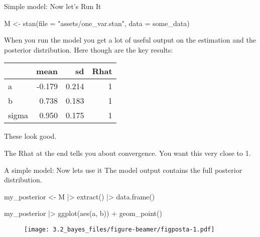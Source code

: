 \documentclass[
  11pt,
  ignorenonframetext,
]{beamer}
\newenvironment{Shaded}{\begin{snugshade}}{\end{snugshade}}
\newcommand{\AttributeTok}[1]{\textcolor[rgb]{0.40,0.45,0.13}{#1}}
\newcommand{\FunctionTok}[1]{\textcolor[rgb]{0.28,0.35,0.67}{#1}}
\newcommand{\NormalTok}[1]{\textcolor[rgb]{0.00,0.23,0.31}{#1}}
\newcommand{\OtherTok}[1]{\textcolor[rgb]{0.00,0.23,0.31}{#1}}
\newcommand{\SpecialCharTok}[1]{\textcolor[rgb]{0.37,0.37,0.37}{#1}}
\newcommand{\StringTok}[1]{\textcolor[rgb]{0.13,0.47,0.30}{#1}}
\begin{document}
\begin{frame}[fragile]{Simple model: Now let's Run It}
\protect\hypertarget{simple-model-now-lets-run-it}{}
\begin{Shaded}
\begin{Highlighting}[]
\NormalTok{M }\OtherTok{\textless{}{-}} \FunctionTok{stan}\NormalTok{(}\AttributeTok{file =} \StringTok{"assets/one\_var.stan"}\NormalTok{, }\AttributeTok{data =}\NormalTok{ some\_data)}
\end{Highlighting}
\end{Shaded}

When you run the model you get a lot of useful output on the estimation
and the posterior distribution. Here though are the key results:

\begin{tabular}{l|r|r|r}
\hline
  & mean & sd & Rhat\\
\hline
a & -0.179 & 0.214 & 1\\
\hline
b & 0.738 & 0.183 & 1\\
\hline
sigma & 0.950 & 0.175 & 1\\
\hline
\end{tabular}

These look good.

The Rhat at the end tells you about convergence. You want this very
close to 1.
\end{frame}

\begin{frame}[fragile]{A simple model: Now lets use it}
\protect\hypertarget{a-simple-model-now-lets-use-it}{}
The model output contains the full posterior distribution.

\begin{Shaded}
\begin{Highlighting}[]
\NormalTok{my\_posterior }\OtherTok{\textless{}{-}}\NormalTok{ M }\SpecialCharTok{|\textgreater{}}
    \FunctionTok{extract}\NormalTok{() }\SpecialCharTok{|\textgreater{}}
    \FunctionTok{data.frame}\NormalTok{()}

\NormalTok{my\_posterior }\SpecialCharTok{|\textgreater{}}
    \FunctionTok{ggplot}\NormalTok{(}\FunctionTok{aes}\NormalTok{(a, b)) }\SpecialCharTok{+} \FunctionTok{geom\_point}\NormalTok{()}
\end{Highlighting}
\end{Shaded}

\begin{figure}

{\centering \texttt{[image: 3.2\_bayes\_files/figure-beamer/figposta-1.pdf]}

}

\end{figure}
\end{frame}
\end{document}
